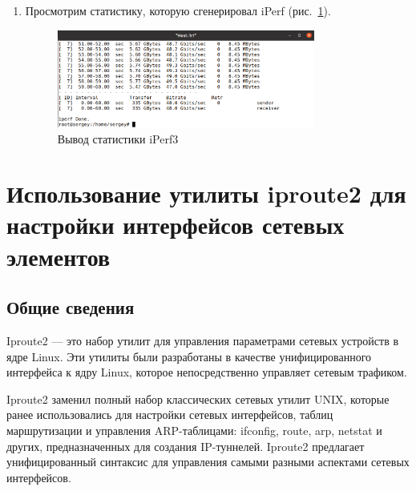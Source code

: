 \begin{enumerate}
\item Просмотрим статистику, которую сгенерировал iPerf
  (рис.~\ref{fig:0013}).

\begin{figure}[!h]
\centering
\includegraphics[width=0.8\textwidth]{image/iperf_4.png}
\caption{Вывод статистики iPerf3}
\label{fig:0013}
\end{figure}

\end{enumerate}

\section{Использование утилиты iproute2 для настройки интерфейсов
  сетевых элементов}

\subsection{Общие сведения}

Iproute2 \cite{iproute} --- это набор утилит для управления
параметрами сетевых устройств в ядре Linux. Эти утилиты были
разработаны в качестве унифицированного интерфейса к ядру Linux,
которое непосредственно управляет сетевым трафиком.

Iproute2 заменил полный набор классических сетевых утилит UNIX, которые
ранее использовались для настройки сетевых интерфейсов, таблиц
маршрутизации и управления ARP-таблицами: ifconfig, route, arp, netstat
и других, предназначенных для создания IP-туннелей. Iproute2 предлагает
унифицированный синтаксис для управления самыми разными аспектами
сетевых интерфейсов.

